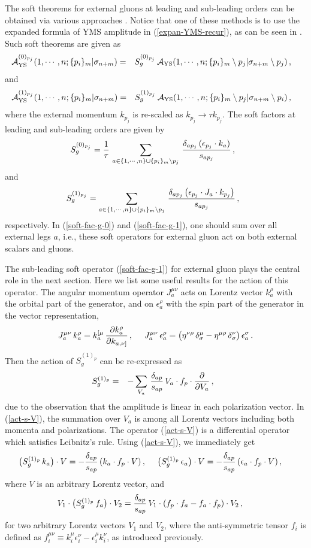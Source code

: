 \documentclass[preprint,showpacs,onecolumn,nofootinbib]{revtex4}
\newcommand{\bea}{\begin{eqnarray}}
\newcommand{\eea}{\end{eqnarray}}
\def\eref#1{(\ref{#1})}
\begin{document}
The soft theorems for external gluons at leading and sub-leading orders can be obtained via various approaches \cite{Casali:2014xpa,Schwab:2014xua}. Notice that one of these methods is to use the expanded formula of YMS amplitude in \eref{expan-YMS-recur}, as can be seen in \cite{Zhou:2022orv}. Such soft theorems are given as
%
\bea
{\cal A}^{(0)_{p_j}}_{\rm YS}(1,\cdots,n;\{p_i\}_m|\sigma_{n+m})
&=&S^{(0)_{p_j}}_g\,{\cal A}_{\rm YS}(1,\cdots,n;\{p_i\}_m\setminus p_j|\sigma_{n+m}\setminus p_j)\,,~~~\label{soft-theo-g0}
\eea
%
and
%
\bea
{\cal A}^{(1)_{p_j}}_{\rm YS}(1,\cdots,n;\{p_i\}_m|\sigma_{n+m})
&=&S^{(1)_{p_j}}_g\,{\cal A}_{\rm YS}(1,\cdots,n;\{p_i\}_m\setminus p_j|\sigma_{n+m}\setminus p_i)\,,~~~\label{soft-theo-g1}
\eea
%
where the external momentum $k_{p_j}$ is re-scaled as $k_{p_j}\to\tau k_{p_j}$. The soft factors at leading and sub-leading orders are given by
%
\bea
S^{(0)_{p_j}}_g={1\over\tau}\,\sum_{a\in\{1,\cdots,n\}\cup\{p_i\}_m\setminus p_j}\,{\delta_{ap_j}\,(\epsilon_{p_j}\cdot k_a)\over s_{ap_j}}\,,~~\label{soft-fac-g-0}
\eea
%
and
%
\bea
S^{(1)_{p_j}}_g=\sum_{a\in\{1,\cdots,n\}\cup\{p_i\}_m\setminus p_j}\,{\delta_{ap_j}\,\big(\epsilon_{p_j}\cdot J_a\cdot k_{p_j}\big)\over s_{ap_j}}\,,~~\label{soft-fac-g-1}
\eea
%
respectively. In \eref{soft-fac-g-0} and \eref{soft-fac-g-1}, one should sum over all external legs $a$, i.e., these soft operators for external gluon act on both external scalars and gluons.

The sub-leading soft operator \eref{soft-fac-g-1} for external gluon plays the central role in the next section. Here we list some useful results for the action of this operator. The angular momentum operator $J_a^{\mu\nu}$ acts on Lorentz vector $k^\rho_a$ with the orbital part of the generator, and on $\epsilon^\rho_a$ with the spin part of the generator in the vector representation,
%
\bea
J_a^{\mu\nu}\,k_a^\rho=k_a^{[\mu}\,{\partial k_a^\rho\over\partial k_{a,\nu]}}\,,~~~~
J_a^{\mu\nu}\,\epsilon_a^\rho=\big(\eta^{\nu\rho}\,\delta^\mu_\sigma-\eta^{\mu\rho}\,\delta^\nu_\sigma\big)\,\epsilon^\sigma_a\,.
\eea
%
Then the action of $S^{(1)_p}_g$ can be re-expressed as
%
\bea
S^{(1)_p}_g&=&-\sum_{V_a}\,{\delta_{ap}\over s_{ap}}\,V_a\cdot f_p\cdot{\partial\over\partial V_a}\,,~~\label{act-s-V}
\eea
%
due to the observation that the amplitude is linear in each polarization vector. In \eref{act-s-V}, the summation over $V_a$
is among all Lorentz vectors including both momenta and polarizations. The operator \eref{act-s-V} is a differential operator which satisfies Leibnitz's rule. Using \eref{act-s-V}, we immediately get
%
\bea
\big(S^{(1)_p}_g\,k_a\big)\cdot V=-{\delta_{ap}\over s_{ap}}\,(k_a\cdot f_p\cdot V)\,,~~~~\big(S^{(1)_p}_g\,\epsilon_a\big)\cdot V=-{\delta_{ap}\over s_{ap}}\,(\epsilon_a\cdot f_p\cdot V)\,,~~~~\label{iden-1}
\eea
%
where $V$ is an arbitrary Lorentz vector, and
%
\bea
V_1\cdot\big(S^{(1)_p}_g\,f_a\big)\cdot V_2={\delta_{ap}\over s_{ap}}\,V_1\cdot(f_p\cdot f_a-f_a\cdot f_p)\cdot V_2\,,~~~~\label{iden-2}
\eea
%
for two arbitrary Lorentz vectors $V_1$ and $V_2$, where the anti-symmetric tensor $f_i$ is defined as $f_i^{\mu\nu}\equiv k_i^\mu\epsilon_i^\nu-\epsilon_i^\mu k_i^\nu$, as introduced previously.
\end{document}
